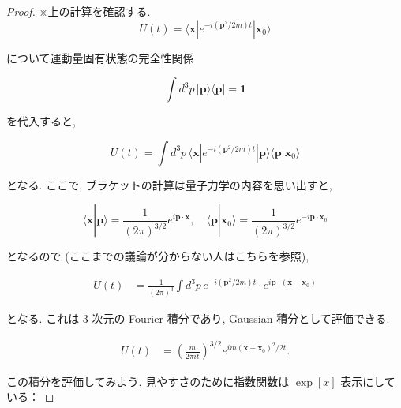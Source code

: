 \documentclass[a4paper,12pt]{article}
\begin{document}
\color{blue}
\begin{proof}

※上の計算を確認する.\\

\begin{equation*}\label{2.a1}
  U(t) = \langle \boldsymbol{x} | e^{-i(\boldsymbol{p}^2 / 2m)t} | \boldsymbol{x}_0 \rangle \tag{2-1.a1}
\end{equation*}

について運動量固有状態の完全性関係

\begin{equation*}
    \int d^3p\, |\boldsymbol{p} \rangle \langle \boldsymbol{p}| = \mathbf{1} \tag{2-1.a2}
\end{equation*}

を代入すると, 

\begin{equation*}
    U(t) = \int d^3p\, \langle \boldsymbol{x} | e^{-i(\boldsymbol{p}^2 / 2m)t} | \boldsymbol{p} \rangle \langle \boldsymbol{p} | \boldsymbol{x}_0 \rangle \tag{2-1.a3}
\end{equation*}

となる. ここで, ブラケットの計算は量子力学の内容を思い出すと, 

\begin{equation*}
    \langle \boldsymbol{x} | \boldsymbol{p} \rangle = \frac{1}{(2\pi)^{3/2}} e^{i \boldsymbol{p} \cdot \boldsymbol{x}}, \quad \langle \boldsymbol{p} | \boldsymbol{x}_0 \rangle = \frac{1}{(2\pi)^{3/2}} e^{-i \boldsymbol{p} \cdot \boldsymbol{x}_0} \tag{2-1.a4}
\end{equation*}

となるので (ここまでの議論が分からない人はこちらを参照),

\begin{align*}\label{2.a5}
    U(t) &= \frac{1}{(2\pi)^3} \int d^3p \, e^{-i(\boldsymbol{p}^2 / 2m)t} \cdot e^{i\boldsymbol{p} \cdot (\boldsymbol{x} - \boldsymbol{x}_0)} \tag{2-1.a5}
\end{align*} 

となる. これは $3$ 次元の Fourier 積分であり, Gaussian 積分として評価できる.

\begin{align*}
    U(t) &= \left( \frac{m}{2\pi i t} \right)^{3/2} e^{i m (\boldsymbol{x} - \boldsymbol{x}_0)^2 / 2t}. \tag{2-1.a6}
\end{align*}

この積分を評価してみよう. 見やすさのために指数関数は $\exp[x]$ 表示にしている：


\end{proof}
\end{document}
